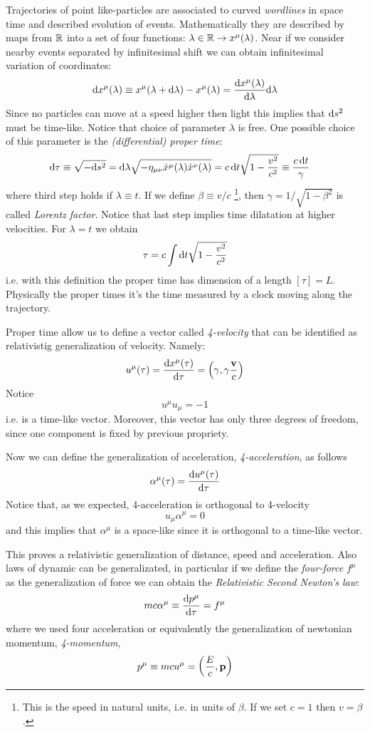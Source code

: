 \documentclass[../main/main.tex]{subfiles}
\begin{document}
Trajectories of point like-particles are associated to curved \emph{wordlines} in space time and described evolution of events. Mathematically they are described by maps from $\mathbb{R}$ into a set of four functions: $\lambda\in\mathbb{R}\to x^\mu(\lambda)$. Near if we consider nearby events separated by infinitesimal shift we can obtain infinitesimal variation of coordinates:
\[\textup{d} x^\mu(\lambda)\equiv x^\mu(\lambda+\textup{d}\lambda)-x^\mu(\lambda)=\frac{\textup{d} x^\mu(\lambda)}{\textup{d}\lambda}\textup{d}\lambda\]
Since no particles can move at a speed higher then light this implies that $\textup{d} s^2$ must be time-like. Notice that choice of parameter $\lambda$ is free. One possible choice of this parameter is the \emph{(differential) proper time}:
\begin{align*}
\textup{d}\tau\equiv\sqrt{-\textup{d} s^2}
&=\textup{d}\lambda\sqrt{-\eta_{\mu\nu}\dot x^\mu(\lambda)\dot x^\nu(\lambda)}
=c\,\textup{d} t\sqrt{1-\frac{v^2}{c^2}}\equiv\frac{c\,\textup{d} t}\gamma
\end{align*}
where third step holds if $\lambda\equiv t$. If we define $\beta\equiv v/c$ \footnote{This is the speed in natural units, i.e. in units of $\beta$. If we set $c=1$ then $v=\beta$.}, then $\gamma=1/\sqrt{1-\beta^2}$ is called \emph{Lorentz factor}. Notice that last step implies time dilatation at higher velocities. For $\lambda=t$ we obtain
\[\tau=c\int\textup{d} t\sqrt{1-\frac{v^2}{c^2}}\]
i.e. with this definition the proper time has dimension of a length $[\tau]=L$. Physically the proper times it's the time measured by a clock moving along the trajectory. 

Proper time allow us to define a vector called \emph{4-velocity} that can be identified as relativistig generalization of velocity. Namely:
\[u^\mu(\tau)=\frac{\textup{d} x^\mu(\tau)}{\textup{d}\tau}=\left(\gamma,\gamma\frac{\mathbf v}{c}\right)\]
Notice 
\[u^\mu u_\mu=-1\]
i.e. is a time-like vector. Moreover, this vector has only three degrees of freedom, since one component is fixed by previous propriety.


Now we can define the generalization of acceleration, \emph{4-acceleration}, as follows
\[\alpha^\mu(\tau)=\frac{\textup{d} u^\mu(\tau)}{\textup{d} \tau}\]
Notice that, as we expected, 4-acceleration is orthogonal to 4-velocity
\[u_\mu\alpha^\mu=0\]
and this implies that $\alpha^\mu$ is a space-like since it is orthogonal to a time-like vector.

This proves a relativistic generalization of distance, speed and acceleration. Also laws of dynamic can be generalizated, in particular if we define the \emph{four-force} $f^\mu$ as the generalization of force we can obtain the
 \emph{Relativistic Second Newton's law}:
\[mc\alpha^\mu\equiv\frac{\textup{d} p^\mu}{\textup{d}\tau}=f^\mu\]
where we used four acceleration or equivalently the generalization of newtonian momentum, \emph{4-momentum},
\[p^\mu\equiv mcu^\mu=\left(\frac Ec,\mathbf p\right)\]
\end{document}
